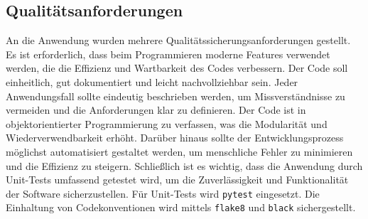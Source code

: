\subsection{Qualitätsanforderungen}\label{sec:qualitätsanforderungen}
An die Anwendung wurden mehrere Qualitätssicherungsanforderungen gestellt.
Es ist erforderlich, dass beim Programmieren moderne Features verwendet werden, die die Effizienz und Wartbarkeit des Codes verbessern.
Der Code soll einheitlich, gut dokumentiert und leicht nachvollziehbar sein.
Jeder Anwendungsfall sollte eindeutig beschrieben werden, um Missverständnisse zu vermeiden und die Anforderungen klar zu definieren.
Der Code ist in objektorientierter Programmierung zu verfassen, was die Modularität und Wiederverwendbarkeit erhöht.
Darüber hinaus sollte der Entwicklungsprozess möglichst automatisiert gestaltet werden, um menschliche Fehler zu minimieren und die Effizienz zu steigern.
Schließlich ist es wichtig, dass die Anwendung durch Unit-Tests umfassend getestet wird, um die Zuverlässigkeit und Funktionalität der Software sicherzustellen.
Für Unit-Tests wird \texttt{pytest} eingesetzt. Die Einhaltung von Codekonventionen wird mittels \texttt{flake8} und \texttt{black} sichergestellt.
